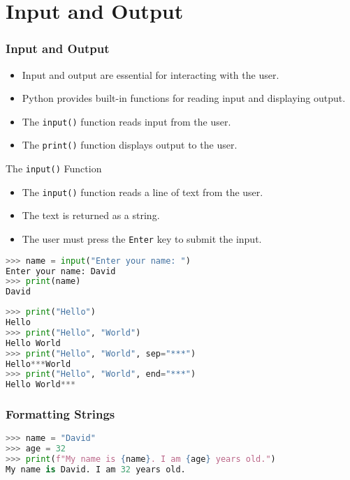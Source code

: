 \section{Input and Output}
\begin{frame}
    \frametitle{Input and Output}
    \begin{itemize}
        \item Input and output are essential for interacting with the user.
        \item Python provides built-in functions for reading input and displaying output.
        \item The \texttt{input()} function reads input from the user.
        \item The \texttt{print()} function displays output to the user.
    \end{itemize}
\end{frame} 

\begin{frame}[fragile]{The \texttt{input()} Function}
    \begin{itemize}
        \item The \texttt{input()} function reads a line of text from the user.
        \item The text is returned as a string.
        \item The user must press the \texttt{Enter} key to submit the input.
    \end{itemize}
    \begin{lstlisting}[style=colorful, language=Python]
>>> name = input("Enter your name: ")
Enter your name: David
>>> print(name)
David
    \end{lstlisting}    
\end{frame}

\begin{frame}[fragile]{}
    \begin{lstlisting}[style=colorful, language=Python]
>>> print("Hello")
Hello
>>> print("Hello", "World")
Hello World
>>> print("Hello", "World", sep="***")
Hello***World
>>> print("Hello", "World", end="***")
Hello World***
    \end{lstlisting}
\end{frame}

\begin{frame}[fragile]
    \frametitle{Formatting Strings}
    \begin{lstlisting}[style=colorful, language=Python]
>>> name = "David"
>>> age = 32
>>> print(f"My name is {name}. I am {age} years old.")
My name is David. I am 32 years old.    
    \end{lstlisting}  
\end{frame}


